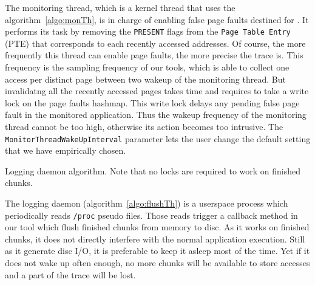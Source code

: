 The monitoring thread, which is a kernel thread that uses the algorithm~\ref{algo:monTh}, is
in charge of enabling false page faults destined for \Moca. It performs its task by
removing the \texttt{PRESENT} flags from the \texttt{Page Table Entry} (PTE) that corresponds to each recently
accessed addresses. Of course, the more frequently this thread can enable page faults, the more
precise the trace is. This frequency is the sampling frequency of our tools, which is able to collect
one access per distinct page between two wakeup of the monitoring thread.
But invalidatng all the recently accessed pages takes time and requires
to take a write lock on the page faults hashmap. This write lock
delays any pending false page fault in the monitored application. Thus the wakeup frequency of the
monitoring thread cannot be too high, otherwise its action becomes too intrusive.
The \texttt{MonitorThreadWakeUpInterval} \Moca parameter lets the user change the default setting
that we have empirically chosen.

\begin{algorithm}[htb]
    \caption{Logging daemon algorithm. Note that no locks are required to
    work on finished chunks.}
    \label{algo:flushTh}
    \begin{algorithmic}[1]
                \State {}
                \State {}
                \EndFor
            \EndFor
            \State {}
        \EndWhile
    \end{algorithmic}
\end{algorithm}

The logging daemon (algorithm~\ref{algo:flushTh}) is a userspace process
which periodically reads \texttt{/proc} pseudo files. Those reads trigger a
callback method in our tool which flush finished chunks from memory to
disc. As it works on finished chunks, it does not directly interfere with the
normal application execution. Still as it generate disc I/O, it is preferable to
keep it asleep most of the time. Yet if it does not wake up often enough, no
more chunks will be available to store accesses and a part of the trace will
be lost.

